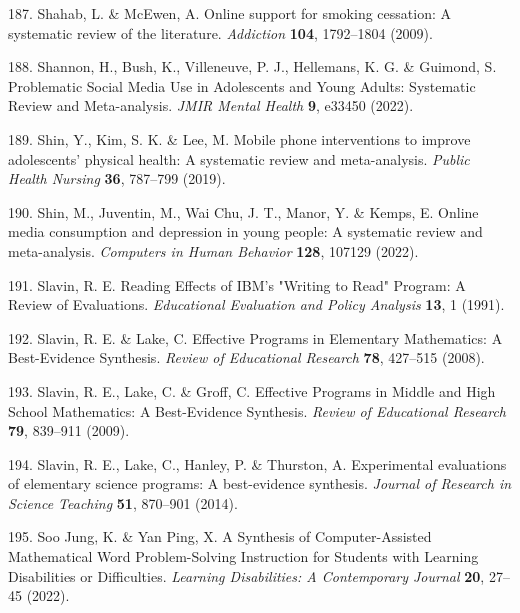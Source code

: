 \documentclass[
  english,
  man]{apa6}
\newenvironment{cslreferences}%
  {}%
  {\par}
\begin{document}
\begin{cslreferences}
\leavevmode\hypertarget{ref-shahabOnlineSupportSmoking2009}{}%
187. Shahab, L. \& McEwen, A. Online support for smoking cessation: A systematic review of the literature. \emph{Addiction} \textbf{104}, 1792--1804 (2009).

\leavevmode\hypertarget{ref-shannonProblematicSocialMedia2022}{}%
188. Shannon, H., Bush, K., Villeneuve, P. J., Hellemans, K. G. \& Guimond, S. Problematic Social Media Use in Adolescents and Young Adults: Systematic Review and Meta-analysis. \emph{JMIR Mental Health} \textbf{9}, e33450 (2022).

\leavevmode\hypertarget{ref-shinMobilePhoneInterventions2019}{}%
189. Shin, Y., Kim, S. K. \& Lee, M. Mobile phone interventions to improve adolescents' physical health: A systematic review and meta-analysis. \emph{Public Health Nursing} \textbf{36}, 787--799 (2019).

\leavevmode\hypertarget{ref-shinOnlineMediaConsumption2022}{}%
190. Shin, M., Juventin, M., Wai Chu, J. T., Manor, Y. \& Kemps, E. Online media consumption and depression in young people: A systematic review and meta-analysis. \emph{Computers in Human Behavior} \textbf{128}, 107129 (2022).

\leavevmode\hypertarget{ref-slavinReadingEffectsIBM1991}{}%
191. Slavin, R. E. Reading Effects of IBM's "Writing to Read" Program: A Review of Evaluations. \emph{Educational Evaluation and Policy Analysis} \textbf{13}, 1 (1991).

\leavevmode\hypertarget{ref-slavinEffectiveProgramsElementary2008}{}%
192. Slavin, R. E. \& Lake, C. Effective Programs in Elementary Mathematics: A Best-Evidence Synthesis. \emph{Review of Educational Research} \textbf{78}, 427--515 (2008).

\leavevmode\hypertarget{ref-slavinEffectiveProgramsMiddle2009}{}%
193. Slavin, R. E., Lake, C. \& Groff, C. Effective Programs in Middle and High School Mathematics: A Best-Evidence Synthesis. \emph{Review of Educational Research} \textbf{79}, 839--911 (2009).

\leavevmode\hypertarget{ref-slavinExperimentalEvaluationsElementary2014}{}%
194. Slavin, R. E., Lake, C., Hanley, P. \& Thurston, A. Experimental evaluations of elementary science programs: A best-evidence synthesis. \emph{Journal of Research in Science Teaching} \textbf{51}, 870--901 (2014).

\leavevmode\hypertarget{ref-soojungSynthesisComputerAssistedMathematical2022}{}%
195. Soo Jung, K. \& Yan Ping, X. A Synthesis of Computer-Assisted Mathematical Word Problem-Solving Instruction for Students with Learning Disabilities or Difficulties. \emph{Learning Disabilities: A Contemporary Journal} \textbf{20}, 27--45 (2022).


\end{cslreferences}
\end{document}
